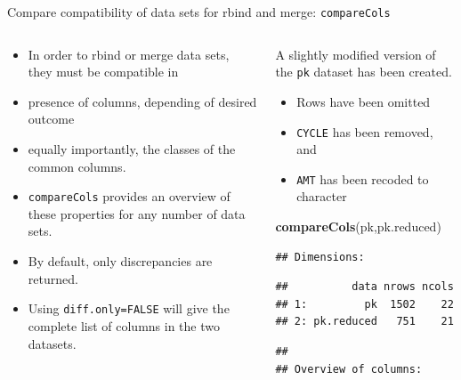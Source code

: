 \documentclass[
  8pt,
  ignorenonframetext,
  aspectratio=169]{beamer}
\newenvironment{Shaded}{\begin{snugshade}}{\end{snugshade}}
\newcommand{\KeywordTok}[1]{\textcolor[rgb]{0.13,0.29,0.53}{\textbf{#1}}}
\newcommand{\NormalTok}[1]{#1}
\providecommand{\tightlist}{%
  \setlength{\itemsep}{0pt}\setlength{\parskip}{0pt}}
\begin{document}
\begin{frame}[fragile]{Compare compatibility of data sets for rbind and
merge: \texttt{compareCols}}
\protect\hypertarget{compare-compatibility-of-data-sets-for-rbind-and-merge-comparecols}{}
\begin{columns}[T]
\begin{column}{0.48\textwidth}
\begin{itemize}
\tightlist
\item
  In order to rbind or merge data sets, they must be compatible in
\item
  presence of columns, depending of desired outcome
\item
  equally importantly, the classes of the common columns.
\item
  \texttt{compareCols} provides an overview of these properties for any
  number of data sets.
\item
  By default, only discrepancies are returned.
\item
  Using \texttt{diff.only=FALSE} will give the complete list of columns
  in the two datasets.
\end{itemize}
\end{column}

\begin{column}{0.48\textwidth}
A slightly modified version of the \texttt{pk} dataset has been created.

\begin{itemize}
\tightlist
\item
  Rows have been omitted
\item
  \texttt{CYCLE} has been removed, and
\item
  \texttt{AMT} has been recoded to character
\end{itemize}

\begin{Shaded}
\begin{Highlighting}[]
\KeywordTok{compareCols}\NormalTok{(pk,pk.reduced)}
\end{Highlighting}
\end{Shaded}

\begin{verbatim}
## Dimensions:
\end{verbatim}

\begin{verbatim}
##          data nrows ncols
## 1:         pk  1502    22
## 2: pk.reduced   751    21
\end{verbatim}

\begin{verbatim}
## 
## Overview of columns:
\end{verbatim}


\end{column}
\end{columns}
\end{frame}
\end{document}
